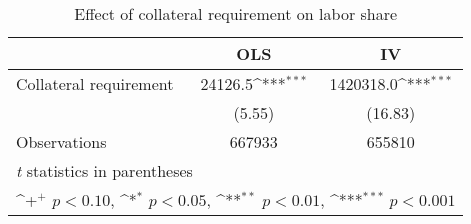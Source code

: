 \begin{table}[htbp]\centering
\def\sym#1{\ifmmode^{#1}\else\(^{#1}\)\fi}
\caption{Effect of collateral requirement on labor share}
\begin{tabular}{l*{2}{c}}
\toprule
                    &\multicolumn{1}{c}{OLS}&\multicolumn{1}{c}{IV}\\
\midrule
Collateral requirement&     24126.5\sym{***}&   1420318.0\sym{***}\\
                    &      (5.55)         &     (16.83)         \\
\midrule
Observations        &      667933         &      655810         \\
\bottomrule
\multicolumn{3}{l}{\footnotesize \textit{t} statistics in parentheses}\\
\multicolumn{3}{l}{\footnotesize \sym{+} \(p<0.10\), \sym{*} \(p<0.05\), \sym{**} \(p<0.01\), \sym{***} \(p<0.001\)}\\
\end{tabular}
\end{table}
